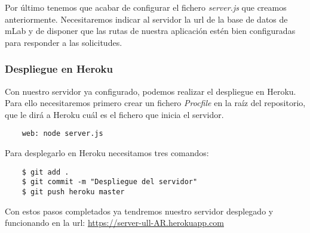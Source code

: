 Por último tenemos que acabar de configurar el fichero \textit{server.js} que creamos anteriormente. Necesitaremos indicar al servidor la url de la base de datos de mLab y de disponer que las rutas de nuestra aplicación estén bien configuradas para responder a las solicitudes. 


\subsubsection{Despliegue en Heroku}

Con nuestro servidor ya configurado, podemos realizar el despliegue en Heroku. Para ello necesitaremos primero crear un fichero \textit{Procfile} en la raíz del repositorio, que le dirá a Heroku cuál es el fichero que inicia el servidor.

\begin{lstlisting}
    web: node server.js
\end{lstlisting}


Para desplegarlo en Heroku necesitamos tres comandos:

\begin{lstlisting}
    $ git add .
    $ git commit -m "Despliegue del servidor"
    $ git push heroku master
\end{lstlisting}

Con estos pasos completados ya tendremos nuestro servidor desplegado y funcionando en la url: \href{https://server-ull-AR.herokuapp.com}{https://server-ull-AR.herokuapp.com}



